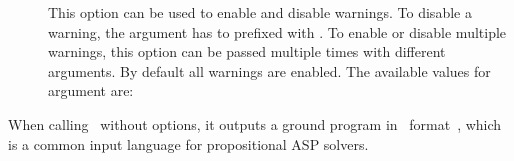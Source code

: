 \begin{description}
\item[]
This option can be used to enable and disable warnings.
To disable a warning, the argument has to prefixed with .
To enable or disable multiple warnings, this option can be passed multiple times with different arguments.
By default all warnings are enabled.
The available values for argument  are:
\end{description}
%
When calling \gringo\ without options,
it outputs a ground program in \smodels\ format~\cite{lparseManual},
which is a common input language for propositional ASP solvers. %

